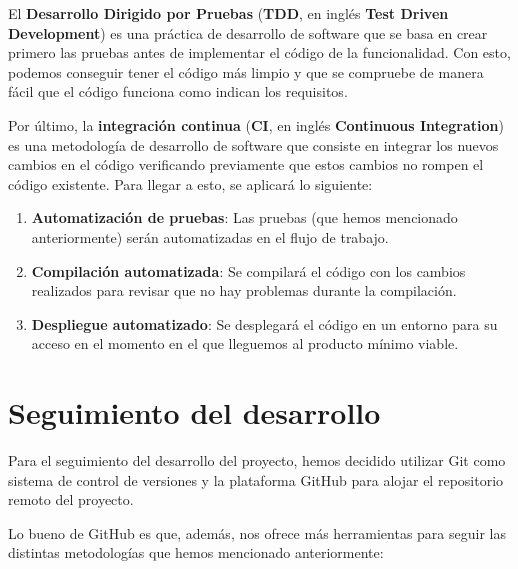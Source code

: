 El \textbf{Desarrollo Dirigido por Pruebas} (\textbf{TDD}, en inglés \textbf{Test 
Driven Development}) \cite{tdd} es una práctica de desarrollo de software que se 
basa en crear primero las pruebas antes de implementar el código de la 
funcionalidad. Con esto, podemos conseguir tener el código más limpio y que se 
compruebe de manera fácil que el código funciona como indican los requisitos.

Por último, la \textbf{integración continua} (\textbf{CI}, en inglés 
\textbf{Continuous Integration}) \cite{ci} es una metodología de desarrollo de 
software que consiste en integrar los nuevos cambios en el código verificando 
previamente que estos cambios no rompen el código existente. Para llegar a esto, se 
aplicará lo siguiente:

\begin{enumerate}
    \item \textbf{Automatización de pruebas}: Las pruebas (que hemos mencionado 
    anteriormente) serán automatizadas en el flujo de trabajo.
    \item \textbf{Compilación automatizada}: Se compilará el código con los cambios 
    realizados para revisar que no hay problemas durante la compilación.
    \item \textbf{Despliegue automatizado}: Se desplegará el código en un entorno 
    para su acceso en el momento en el que lleguemos al producto mínimo viable.
\end{enumerate}

\section{Seguimiento del desarrollo}

Para el seguimiento del desarrollo del proyecto, hemos decidido utilizar Git como 
sistema de control de versiones y la plataforma GitHub para alojar el repositorio 
remoto del proyecto.

Lo bueno de GitHub es que, además, nos ofrece más herramientas para seguir las 
distintas metodologías que hemos mencionado anteriormente:

